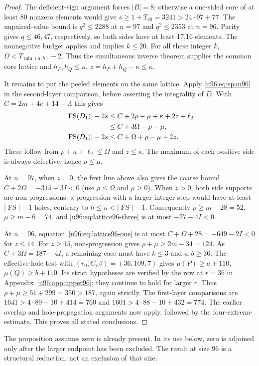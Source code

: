 \documentclass[11pt,a4paper]{article}
\theoremstyle{remark}
\newcommand{\FS}{\operatorname{FS}}
\begin{document}
\begin{proof}
The deficient-sign argument forces $|B|=8$: otherwise a one-sided core
of at least 80 nonzero elements would give
$s\geq1+T_{80}=3241>24\cdot97+77$. The unpaired-value bound is
$q^2\leq2288$ at $n=97$ and $q^2\leq2353$ at $n=96$.
Parity gives $q\leq46,47$, respectively, so both sides have at least
17,16 elements. The nonnegative budget applies and implies $k\leq20$.
For all these integer $k$, $\Omega<T_{\min(a,b)}-2$. Thus the simultaneous
inverse theorem supplies the common core lattice and
$h_P,h_Q\leq\kappa$, $z=h_P+h_Q-\kappa\leq\kappa$.

It remains to put the peeled elements on the same lattice. Apply
\eqref{u96:eq:span96} in the second-layer comparison, before asserting the
integrality of $D$. With $C=2m+4e+14-\Lambda$ this gives
\begin{align}
 |\FS(D_1)|-2s
 &\leq C+2\rho-\mu+\kappa+2z+\ell_2\notag\\
 &\leq C+3\Omega-\rho-\mu,\label{u96:eq:lattice96-three}\\
 |\FS(D_1)|-2s
 &\leq C+\Omega+\rho-\mu+2z.\label{u96:eq:lattice96-one}
\end{align}
These follow from $\rho+\kappa+\ell_2\leq\Omega$ and $z\leq\kappa$.
The maximum of each positive side is always defective; hence
$\rho\leq\mu$.

At $n=97$, when $z=0$, the first line above also gives the coarse bound
$C+2\Omega=-315-3I<0$ (use $\rho\leq\Omega$ and $\mu\geq0$).
When $z>0$, both side supports are non-progressions: a progression with
a larger integer step would have at least $|\FS|-1$ holes, contrary to
$h\leq\kappa<|\FS|-1$.
Consequently $\rho\geq m-28=52$, $\mu\geq m-6=74$, and
\eqref{u96:eq:lattice96-three} is at most $-27-4I<0$.

At $n=96$, equation~\eqref{u96:eq:lattice96-one} is at most
$C+\Omega+28=-649-2I<0$ for $z\leq14$.
For $z\geq15$, non-progression gives $\rho+\mu\geq2m-34=124$.
As $C+3\Omega=187-4I$, a remaining case must have $k\leq3$ and
$a,b\geq36$. The effective-hole test with $(r_0,C,\beta)=(36,109,7)$
gives $\mu(P)\geq a+110$, $\mu(Q)\geq b+110$.
Its strict hypotheses are verified by the row at $r=36$ in
Appendix~\ref{u96:app:upper96}; they continue to hold for larger $r$.
Thus $\rho+\mu\geq51+299=350>187$, again strictly.
The first-layer comparisons are
$1641>4\cdot89-10+414=760$ and
$1601>4\cdot88-10+432=774$.
The earlier overlap and hole-propagation arguments now apply, followed
by the four-extreme estimate. This proves all stated conclusions.
\end{proof}
The proposition assumes zero is already present. In its use below, zero
is adjoined only after the larger endpoint has been excluded. The result
at size 96 is a structural reduction, not an exclusion of that size.
\end{document}
